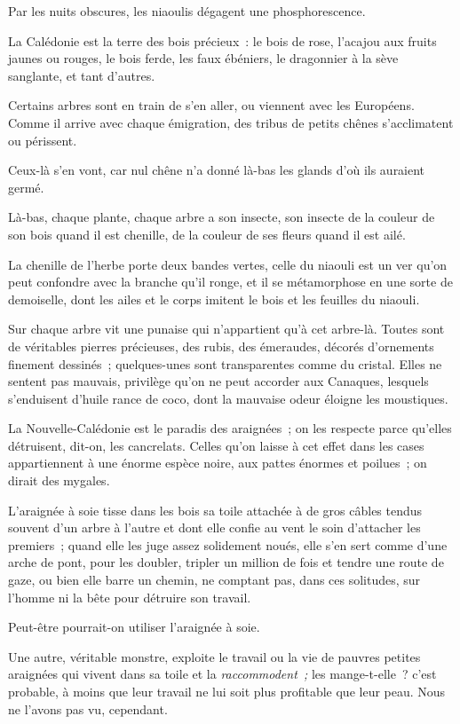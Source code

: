 \documentclass[french,twoside]{book} %
\begin{document}
Par les nuits obscures, les niaoulis dégagent une phosphorescence.\par
 La Calédonie est la terre des bois précieux : le bois de rose, l’acajou aux fruits jaunes ou rouges, le bois ferde, les faux ébéniers, le dragonnier à la sève sanglante, et tant d’autres.\par
Certains arbres sont en train de s’en aller, ou viennent avec les Européens. Comme il arrive avec chaque émigration, des tribus de petits chênes s’acclimatent ou périssent.\par
Ceux-là s’en vont, car nul chêne n’a donné là-bas les glands d’où ils auraient germé.\par
Là-bas, chaque plante, chaque arbre a son insecte, son insecte de la couleur de son bois quand il est chenille, de la couleur de ses fleurs quand il est ailé.\par
La chenille de l’herbe porte deux bandes vertes, celle du niaouli est un ver qu’on peut confondre avec la branche qu’il ronge, et il se métamorphose en une sorte de demoiselle, dont les ailes et le corps imitent le bois et les feuilles du niaouli.\par
Sur chaque arbre vit une punaise qui n’appartient qu’à cet arbre-là. Toutes sont de véritables pierres précieuses, des rubis, des émeraudes, décorés d’ornements finement dessinés ; quelques-unes sont transparentes comme du cristal. Elles ne sentent pas mauvais, privilège qu’on ne peut accorder aux Canaques, lesquels s’enduisent  d’huile rance de coco, dont la mauvaise odeur éloigne les moustiques.\par
La Nouvelle-Calédonie est le paradis des araignées ; on les respecte parce qu’elles détruisent, dit-on, les cancrelats. Celles qu’on laisse à cet effet dans les cases appartiennent à une énorme espèce noire, aux pattes énormes et poilues ; on dirait des mygales.\par
L’araignée à soie tisse dans les bois sa toile attachée à de gros câbles tendus souvent d’un arbre à l’autre et dont elle confie au vent le soin d’attacher les premiers ; quand elle les juge assez solidement noués, elle s’en sert comme d’une arche de pont, pour les doubler, tripler un million de fois et tendre une route de gaze, ou bien elle barre un chemin, ne comptant pas, dans ces solitudes, sur l’homme ni la bête pour détruire son travail.\par
Peut-être pourrait-on utiliser l’araignée à soie.\par
Une autre, véritable monstre, exploite le travail ou la vie de pauvres petites araignées qui vivent dans sa toile et la \emph{raccommodent ;} les mange-t-elle ? c’est probable, à moins que leur travail ne lui soit plus profitable que leur peau. Nous ne l’avons pas vu, cependant.\par
\end{document}

